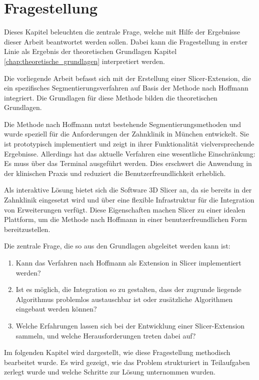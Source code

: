 \chapter{Fragestellung}
\label{chap:fragestellung} Dieses Kapitel beleuchten die zentrale Frage, welche
mit Hilfe der Ergebnisse dieser Arbeit beantwortet werden sollen. Dabei kann die
Fragestellung in erster Linie als Ergebnis der theoretischen Grundlagen Kapitel
\ref{chap:theoretische_grundlagen} interpretiert werden.

Die vorliegende Arbeit befasst sich mit der Erstellung einer Slicer-Extension,
die ein spezifisches Segmentierungsverfahren auf Basis der Methode nach Hoffmann
integriert. Die Grundlagen für diese Methode bilden die theoretischen Grundlagen.

Die Methode nach Hoffmann nutzt bestehende Segmentierungsmethoden und wurde speziell
für die Anforderungen der Zahnklinik in München entwickelt. Sie ist prototypisch
implementiert und zeigt in ihrer Funktionalität vielversprechende Ergebnisse. Allerdings
hat das aktuelle Verfahren eine wesentliche Einschränkung: Es muss über das
Terminal ausgeführt werden. Dies erschwert die Anwendung in der klinischen Praxis
und reduziert die Benutzerfreundlichkeit erheblich.

Als interaktive Lösung bietet sich die Software 3D Slicer an, da sie bereits in
der Zahnklinik eingesetzt wird und über eine flexible Infrastruktur für die
Integration von Erweiterungen verfügt. Diese Eigenschaften machen Slicer zu einer
idealen Plattform, um die Methode nach Hoffmann in einer benutzerfreundlichen
Form bereitzustellen.

Die zentrale Frage, die so aus den Grundlagen abgeleitet werden kann ist:

\begin{enumerate}
	\item Kann das Verfahren nach Hoffmann als Extension in Slicer implementiert werden?

	\item Ist es möglich, die Integration so zu gestalten, dass der zugrunde liegende
		Algorithmus problemlos austauschbar ist oder zusätzliche Algorithmen eingebaut
		werden können?

	\item Welche Erfahrungen lassen sich bei der Entwicklung einer Slicer-Extension
		sammeln, und welche Herausforderungen treten dabei auf?
\end{enumerate}

Im folgenden Kapitel wird dargestellt, wie diese Fragestellung methodisch bearbeitet
wurde. Es wird gezeigt, wie das Problem strukturiert in Teilaufgaben zerlegt wurde
und welche Schritte zur Lösung unternommen wurden.